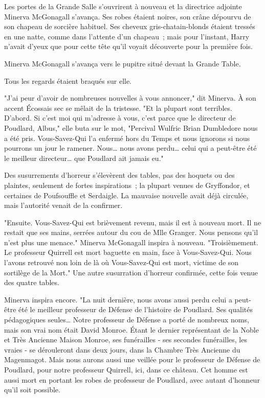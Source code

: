 Les portes de la Grande Salle s'ouvrirent à nouveau et la directrice adjointe Minerva McGonagall s'avança. Ses robes étaient noires, son crâne dépourvu de son chapeau de sorcière habituel. Ses cheveux gris-chatain-blonds étaient tressés en une natte, comme dans l'attente d'un chapeau~; mais pour l'instant, Harry n'avait d'yeux que pour cette tête qu'il voyait découverte pour la première fois.

Minerva McGonagall s'avança vers le pupitre situé devant la Grande Table.

Tous les regards étaient braqués sur elle.

"J'ai peur d'avoir de nombreuses nouvelles à vous annoncer," dit Minerva. À son accent Écossais sec se mêlait de la tristesse. "Et la plupart sont terribles. D'abord. Si c'est moi qui m'adresse à vous, c'est parce que le directeur de Poudlard, Albus," elle buta sur le mot, "Percival Wulfric Brian Dumbledore nous a été pris. Vous-Savez-Qui l'a enfermé hors du Temps et nous ignorons si nous pourrons un jour le ramener. Nous… nous avons perdu… celui qui a peut-être été le meilleur directeur… que Poudlard ait jamais eu."

Des susurrements d'horreur s'élevèrent des tables, pas des hoquets ou des plaintes, seulement de fortes inspirations~; la plupart venues de Gryffondor, et certaines de Poufsouffle et Serdaigle. La mauvaise nouvelle avait déjà circulée, mais l'autorité venait de la confirmer.

"Ensuite. Vous-Savez-Qui est brièvement revenu, mais il est à nouveau mort. Il ne restait que ses mains, serrées autour du cou de Mlle Granger. Nous pensons qu'il n'est plus une menace." Minerva McGonagall inspira à nouveau. "Troisièmement. Le professeur Quirrell est mort baguette en main, face à Vous-Savez-Qui. Nous l'avons retrouvé non loin de là où Vous-Savez-Qui est mort, victime de son sortilège de la Mort." Une autre susurration d'horreur confirmée, cette fois venue des quatre tables.

Minerva inspira encore. "La nuit dernière, nous avons aussi perdu celui a peut-être été le meilleur professeur de Défense de l'histoire de Poudlard. Ses qualités pédagogiques seules… Notre professeur de Défense a porté de nombreux noms, mais son vrai nom était David Monroe. Étant le dernier représentant de la Noble et Très Ancienne Maison Monroe, ses funérailles - ses secondes funérailles, les vraies - se dérouleront dans deux jours, dans la Chambre Très Ancienne du Magenmagot. Mais nous aurons aussi une veillée pour le professeur de Défense de Poudlard, pour notre professeur Quirrell, ici, dans ce château. Cet homme est aussi mort en portant les robes de professeur de Poudlard, avec autant d'honneur qu'il soit possible.

